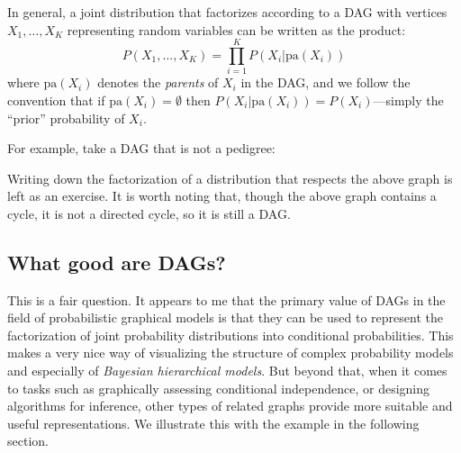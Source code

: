 \documentclass[11pt]{article}
\begin{document}
In general, a joint distribution that factorizes according to a DAG with vertices $X_1,\ldots, X_K$  
representing random variables can be written as the product:
\[
P(X_1,\ldots, X_K) = \prod_{i=1}^K P(X_i | \mathrm{pa}(X_i))
\]
where $\mathrm{pa}(X_i)$ denotes the {\em parents} of $X_i$ in the DAG, and we
follow the convention that if $\mathrm{pa}(X_i) = \emptyset$ then 
$P(X_i | \mathrm{pa}(X_i)) = P(X_i)$---simply the ``prior'' probability of $X_i$.

For example, take a DAG that is not a pedigree:
\begin{center}
\end{center}
Writing down the factorization of a distribution that respects the above graph is left
as an exercise.  It is worth noting that, though the above graph contains a cycle,
it is not a directed cycle, so it is still a DAG.

\subsection{What good are DAGs?}
This is a fair question.  It appears to me that the primary value of DAGs in the field of 
probabilistic graphical models is that they can be used to represent the factorization
of joint probability distributions into conditional probabilities.  This makes a very nice
way of visualizing the structure of complex probability models and especially of
{\em Bayesian hierarchical models}.  But beyond that, when it comes to tasks such 
as graphically assessing conditional independence, or designing algorithms for 
inference, other types of related graphs provide more suitable and useful representations.
We illustrate this with the example in the following section.
\end{document}
